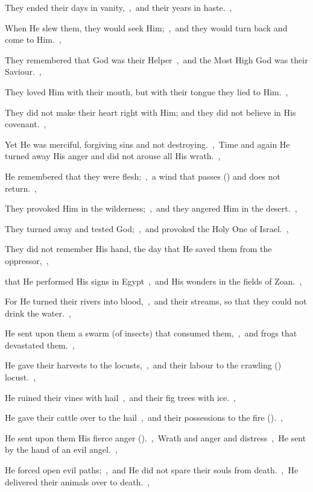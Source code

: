 \documentclass[12pt,twoside,a5paper]{article}
\begin{document}
\begin{halfparskip}
  They ended their days in vanity,~\sep\ and their years in haste.~\sep

  When He slew them, they would seek Him;~\sep\ and they would turn back and come to Him.~\sep

  They remembered that God was their Helper~\sep\ and the Most High God was their Saviour.~\sep

  They loved Him with their mouth, but with their tongue they lied to Him.~\sep

  They did not make their heart right with Him; and they did not believe in His covenant.~\sep

  Yet He was merciful, forgiving sins and not destroying.~\sep\ Time and again He turned away His anger and did not arouse all His wrath.~\sep

  He remembered that they were flesh;~\sep\ a wind that passes () and does not return.~\sep

  They provoked Him in the wilderness;~\sep\ and they angered Him in the desert.~\sep

  They turned away and tested God;~\sep\ and provoked the Holy One of Israel.~\sep

  They did not remember His hand, the day that He saved them from the oppressor,~\sep

  that He performed His signs in Egypt~\sep\ and His wonders in the fields of Zoan.~\sep

  For He turned their rivers into blood,~\sep\ and their streams, so that they could not drink the water.~\sep

  He sent upon them a swarm (of insects) that consumed them,~\sep\ and frogs that devastated them.~\sep

  He gave their harvests to the locusts,~\sep\ and their labour to the crawling () locust.~\sep

  He ruined their vines with hail~\sep\ and their fig trees with ice.~\sep

  He gave their cattle over to the hail~\sep\ and their possessions to the fire ().~\sep

  He sent upon them His fierce anger ().~\sep\ Wrath and anger and distress~\sep\ He sent by the hand of an evil angel.~\sep

  He forced open evil paths;~\sep\ and He did not spare their souls from death.~\sep\ He delivered their animals over to death.~\sep


\end{halfparskip}
\end{document}

